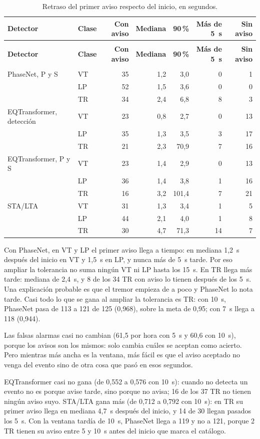 \documentclass[11pt,a4paper,oneside,spanish,oldfontcommands]{memoir}
\newcommand{\cabecera}[2]{%
  \toprule #1 \\ \midrule \endfirsthead
  \multicolumn{#2}{l}{\itshape Cuadro \thetable{} (continuación)}\\
  \toprule #1 \\ \midrule \endhead
  \midrule \multicolumn{#2}{r}{\itshape Continúa en la página siguiente}\\ \endfoot
  \bottomrule \endlastfoot}
\begin{document}
{\small
\setlength{\tabcolsep}{4pt}
\begin{longtable}{>{\raggedright\arraybackslash}p{4.4cm}lrrrrr}
\caption{Retraso del primer aviso respecto del inicio, en segundos.}\label{tab:retraso}\\
\cabecera{\textbf{Detector} & \textbf{Clase} & \textbf{Con aviso} & \textbf{Mediana} & \textbf{90\,\%} & \textbf{Más de 5~s} & \textbf{Sin aviso}}{7}
PhaseNet, P y S & VT & 35 & 1,2 & 3,0 & 0 & 1 \\
 & LP & 52 & 1,5 & 3,6 & 0 & 0 \\
 & TR & 34 & 2,4 & 6,8 & 8 & 3 \\
\midrule
EQTransformer, detección & VT & 23 & 0,8 & 2,7 & 0 & 13 \\
 & LP & 35 & 1,3 & 3,5 & 3 & 17 \\
 & TR & 21 & 2,3 & 70,9 & 7 & 16 \\
\midrule
EQTransformer, P y S & VT & 23 & 1,4 & 2,9 & 0 & 13 \\
 & LP & 36 & 1,4 & 3,8 & 1 & 16 \\
 & TR & 16 & 3,2 & 101,4 & 7 & 21 \\
\midrule
STA/LTA & VT & 31 & 1,3 & 3,4 & 1 & 5 \\
 & LP & 44 & 2,1 & 4,0 & 1 & 8 \\
 & TR & 30 & 4,7 & 71,3 & 14 & 7 \\
\end{longtable}
}

Con PhaseNet, en VT y LP el primer aviso llega a tiempo: en mediana 1,2~s
después del inicio en VT y 1,5~s en LP, y nunca más de 5~s tarde. Por eso
ampliar la tolerancia no suma ningún VT ni LP hasta los 15~s. En TR llega más
tarde: mediana de 2,4~s, y 8 de los 34 TR con aviso lo tienen después de los
5~s. Una explicación probable es que el tremor empieza de a poco y PhaseNet lo
nota tarde. Casi todo lo que se gana al ampliar la tolerancia es TR: con 10~s,
PhaseNet pasa de 113 a 121 de 125 (0,968), sobre la meta de 0,95; con 7~s llega
a 118 (0,944).

Las falsas alarmas casi no cambian (61,5 por hora con 5~s y 60,6 con 10~s),
porque los avisos son los mismos: solo cambia cuáles se aceptan como acierto.
Pero mientras más ancha es la ventana, más fácil es que el aviso aceptado no
venga del evento sino de otra cosa que pasó en esos segundos.

EQTransformer casi no gana (de 0,552 a 0,576 con 10~s): cuando no detecta un
evento no es porque avise tarde, sino porque no avisa; 16 de los 37 TR no tienen
ningún aviso suyo. STA/LTA gana más (de 0,712 a 0,792 con 10~s): en TR su primer
aviso llega en mediana 4,7~s después del inicio, y 14 de 30 llegan pasados los
5~s. Con la ventana tardía de 10~s, PhaseNet llega a 119 y no a 121, porque 2 TR
tienen su aviso entre 5 y 10~s antes del inicio que marca el catálogo.
\end{document}
